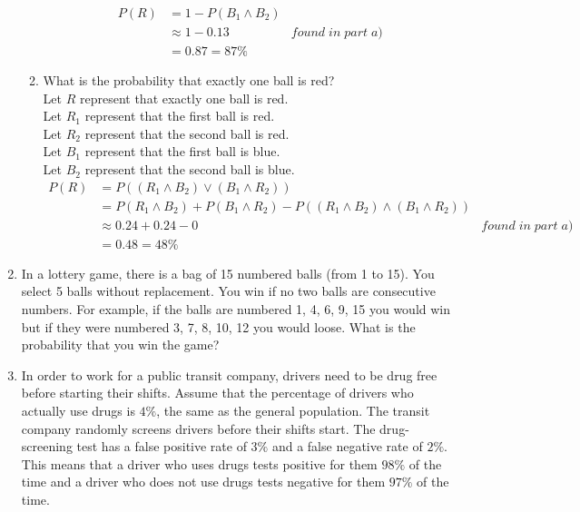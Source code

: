 \documentclass{article}
\begin{document}
\begin{enumerate}
\begin{enumerate}
\begin {align}
P(R) &= 1 - P(B_{1} \land B_{2})\\
&\approx 1 - 0.13&found\;in\;part\;a)\\
&= 0.87 = 87\%
\end {align}
\item What is the probability that exactly one ball is red? \\

Let $R$ represent that exactly one ball is red.\\
Let $R_{1}$ represent that the first ball is red.\\
Let $R_{2}$ represent that the second ball is red.\\
Let $B_{1}$ represent that the first ball is blue.\\
Let $B_{2}$ represent that the second ball is blue.\\

\begin {align}
P(R) &= P((R_{1} \land B_{2}) \lor (B_{1} \land R_{2}))\\
&= P(R_{1} \land B_{2}) + P(B_{1} \land R_{2}) - P((R_{1} \land B_{2}) \land (B_{1} \land R_{2}))\\
& \approx 0.24 + 0.24 - 0&found\;in\;part\;a)\\
&= 0.48 = 48\%
\end {align}


\end{enumerate}

\item In a lottery game, there is a bag of 15 numbered balls (from 1 to 15). You select 5 balls without replacement. You win if no two balls are consecutive numbers. For example, if the balls are numbered 1, 4, 6, 9, 15 you would win but if they were numbered 3, 7, 8, 10, 12 you would loose.  What is the probability that you win the game? 


\item In order to work for a public transit company,  drivers need to be drug free before starting their shifts. Assume that the percentage of drivers who actually use drugs is  $4\%$,  the same as the general population. The transit company randomly screens drivers before their shifts start. The drug-screening test has a false positive rate of $3\%$ and a false negative rate of $2\%$. This means that a driver who uses drugs tests positive for them $98\%$ of the time and a driver who does not use drugs tests negative for them $97\%$ of the time. 


\end{enumerate}
\end{document}
